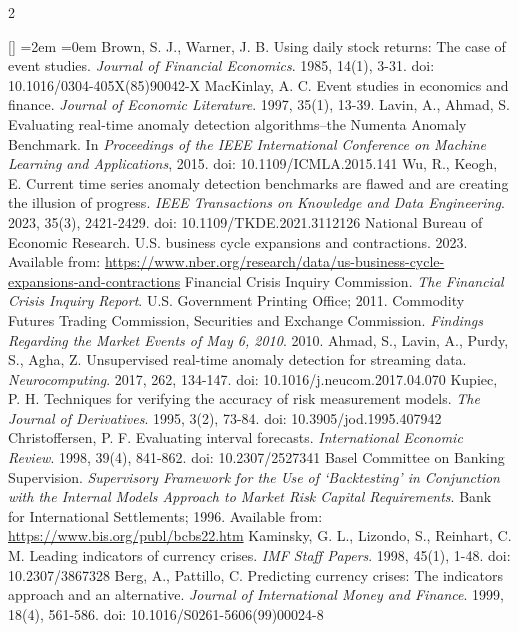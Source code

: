 \documentclass{book}
\begin{document}
\begin{multicols}{2}
\parskip=10pt
\vspace{-6pt}
\begin{list}{[]}{ %
\leftmargin=2em%
=0em%
\renewcommand{\makelabel}[1]{#1 \hfil}}%
 Brown, S. J., Warner, J. B. Using daily stock returns: The case of event studies. {\it Journal of Financial Economics}. 1985, 14(1), 3-31. doi: 10.1016/0304-405X(85)90042-X
 MacKinlay, A. C. Event studies in economics and finance. {\it Journal of Economic Literature}. 1997, 35(1), 13-39.
 Lavin, A., Ahmad, S. Evaluating real-time anomaly detection algorithms--the Numenta Anomaly Benchmark. In {\it Proceedings of the IEEE International Conference on Machine Learning and Applications}, 2015. doi: 10.1109/ICMLA.2015.141
 Wu, R., Keogh, E. Current time series anomaly detection benchmarks are flawed and are creating the illusion of progress. {\it IEEE Transactions on Knowledge and Data Engineering}. 2023, 35(3), 2421-2429. doi: 10.1109/TKDE.2021.3112126
 National Bureau of Economic Research. U.S. business cycle expansions and contractions. 2023. Available from: \url{https://www.nber.org/research/data/us-business-cycle-expansions-and-contractions}
 Financial Crisis Inquiry Commission. {\it The Financial Crisis Inquiry Report}. U.S. Government Printing Office; 2011.
 Commodity Futures Trading Commission, Securities and Exchange Commission. {\it Findings Regarding the Market Events of May 6, 2010}. 2010.
 Ahmad, S., Lavin, A., Purdy, S., Agha, Z. Unsupervised real-time anomaly detection for streaming data. {\it Neurocomputing}. 2017, 262, 134-147. doi: 10.1016/j.neucom.2017.04.070
 Kupiec, P. H. Techniques for verifying the accuracy of risk measurement models. {\it The Journal of Derivatives}. 1995, 3(2), 73-84. doi: 10.3905/jod.1995.407942
 Christoffersen, P. F. Evaluating interval forecasts. {\it International Economic Review}. 1998, 39(4), 841-862. doi: 10.2307/2527341
 Basel Committee on Banking Supervision. {\it Supervisory Framework for the Use of `Backtesting' in Conjunction with the Internal Models Approach to Market Risk Capital Requirements}. Bank for International Settlements; 1996. Available from: \url{https://www.bis.org/publ/bcbs22.htm}
 Kaminsky, G. L., Lizondo, S., Reinhart, C. M. Leading indicators of currency crises. {\it IMF Staff Papers}. 1998, 45(1), 1-48. doi: 10.2307/3867328
 Berg, A., Pattillo, C. Predicting currency crises: The indicators approach and an alternative. {\it Journal of International Money and Finance}. 1999, 18(4), 561-586. doi: 10.1016/S0261-5606(99)00024-8

\end{list}
\end{multicols}
\end{document}
